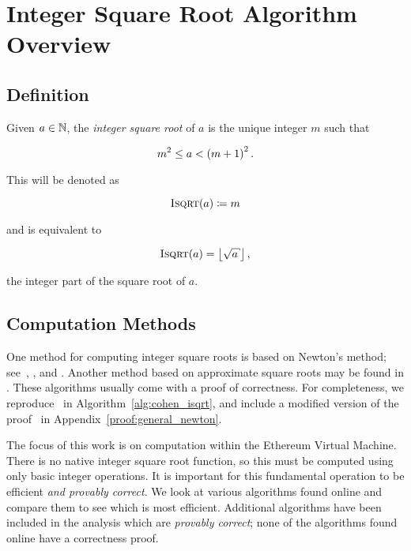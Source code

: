 \section{Integer Square Root Algorithm Overview}

\subsection{Definition}

Given $a\in\mathbb{N}$, the \emph{integer square root} of $a$
is the unique integer $m$ such that

\begin{equation}
    m^{2} \le a < \left( m+1 \right)^{2}.
\end{equation}

\noindent
This will be denoted as

\begin{equation}
    \textsc{Isqrt}( a ) \coloneqq{} m
\end{equation}

\noindent
and is equivalent to 

\begin{equation}
    \isqrt{a} = \floor{\sqrt{a}},
\end{equation}

\noindent
the integer part of the square root of $a$.

\subsection{Computation Methods}

One method for computing integer square roots is based
on Newton's method;
see~\cite[Algorithm 1.7.1]{cohen1993},
\cite[Algorithm 9.2.11]{PrimeNumbersACP2005},
and  \cite[Algorithm 1.13]{ModernComputerArithmetic051}.
Another method based on approximate square roots
may be found in \cite{PythonIsqrt}.
These algorithms usually come with a proof of correctness.
For completeness, we reproduce~\cite[Algorithm 1.7.1]{cohen1993}
in Algorithm~\ref{alg:cohen_isqrt},
and include a modified version of the
proof~\cite[Algorithm 1.7.1, Proof]{cohen1993}
in Appendix~\ref{proof:general_newton}.



The focus of this work is on computation within the Ethereum Virtual Machine.
There is no native integer square root function,
so this must be computed using only basic integer operations.
It is important for this fundamental operation to be efficient
\emph{and provably correct}.
We look at various algorithms found online
and compare them to see which is most efficient.
Additional algorithms have been included in the analysis
which are \emph{provably correct};
none of the algorithms found online have a correctness proof.
